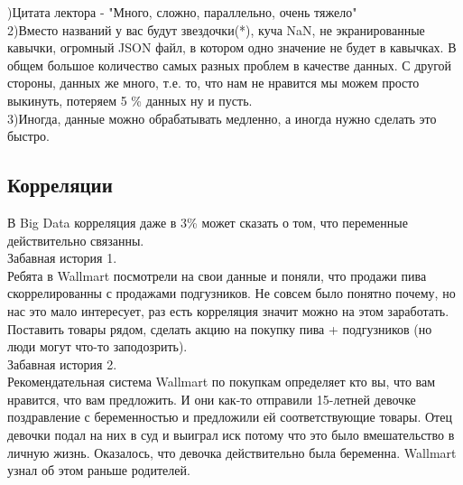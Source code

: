 \documentclass{article}
\begin{document}
)Цитата лектора - "Много, сложно, параллельно, очень тяжело"\\
2)Вместо названий у вас будут звездочки(*), куча NaN, не экранированные кавычки, огромный JSON файл, в котором одно значение не будет в кавычках. В общем большое количество самых разных проблем в качестве данных. С другой стороны, данных же много, т.е. то, что нам не нравится мы можем просто выкинуть, потеряем 5 \% данных ну и пусть.\\
3)Иногда, данные можно обрабатывать медленно, а иногда нужно сделать это быстро.

\subsection{Корреляции}
В Big Data корреляция даже в 3\% может сказать о том, что переменные действительно связанны.\\

\noindent Забавная история 1.\\

Ребята в Wallmart посмотрели на свои данные и поняли, что продажи пива скоррелированны с продажами подгузников. Не совсем было понятно почему, но нас это мало интересует, раз есть корреляция значит можно на этом заработать. Поставить товары рядом, сделать акцию на покупку пива + подгузников (но люди могут что-то заподозрить).\\

\noindent Забавная история 2.\\

Рекомендательная система Wallmart по покупкам определяет кто вы, что вам нравится, что вам предложить. И они как-то отправили 15-летней девочке поздравление с беременностью и предложили ей соответствующие товары. Отец девочки подал на них в суд и выиграл иск потому что это было вмешательство в личную жизнь. Оказалось, что девочка действительно была беременна. Wallmart узнал об этом раньше родителей.
\end{document}
